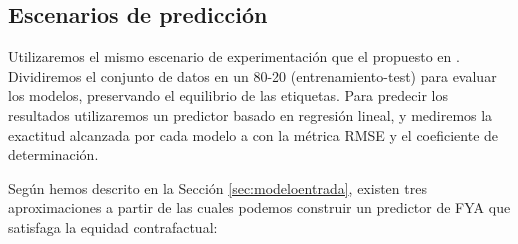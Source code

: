 \documentclass[oneside,openright,titlepage,numbers=noenddot,openany,headinclude,footinclude=true,
cleardoublepage=empty,abstractoff,BCOR=5mm,paper=a4,fontsize=12pt,main=spanish]{scrreprt}
\begin{document}
\subsection{Escenarios de predicción} \label{subsec:escenariospred}

Utilizaremos el mismo escenario de experimentación que el propuesto en \cite{counterfactual2018}. Dividiremos el conjunto de datos en un 80-20 (entrenamiento-test) para evaluar los modelos, preservando el equilibrio de las etiquetas. Para predecir los resultados utilizaremos un predictor basado en regresión lineal, y mediremos la exactitud alcanzada por cada modelo a con la métrica RMSE y el coeficiente de determinación.  

Según hemos descrito en la Sección \ref{sec:modeloentrada}, existen tres aproximaciones a partir de las cuales podemos construir un predictor de FYA que satisfaga la equidad contrafactual: 
\end{document}
